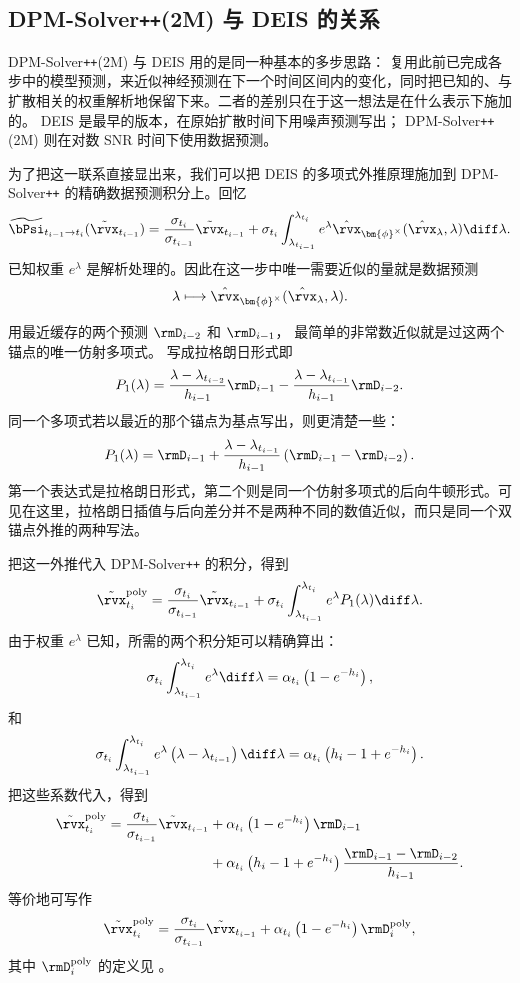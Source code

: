 \subsection{DPM-Solver\texttt{++}(2M) 与 DEIS 的关系}
\label{subsec:dpm-deis}

DPM-Solver\texttt{++}(2M) 与 DEIS 用的是同一种基本的多步思路：
复用此前已完成各步中的模型预测，来近似神经预测在下一个时间区间内的变化，同时把已知的、与扩散相关的权重解析地保留下来。二者的差别只在于这一想法是在什么表示下施加的。
DEIS 是最早的版本，在原始扩散时间下用噪声预测写出；
DPM-Solver\texttt{++}(2M) 则在对数 SNR 时间下使用数据预测。

为了把这一联系直接显出来，我们可以把 DEIS 的多项式外推原理施加到 DPM-Solver\texttt{++} 的精确数据预测积分上。回忆
\[
\widetilde\bPsi_{t_{i-1}\to t_i}
(\tilde\rvx_{t_{i-1}})
=
\frac{\sigma_{t_i}}{\sigma_{t_{i-1}}}
\tilde\rvx_{t_{i-1}}
+
\sigma_{t_i}
\int_{\lambda_{t_{i-1}}}^{\lambda_{t_i}}
e^\lambda
\hat{\rvx}_{\bm{\phi}^\times}
(\hat\rvx_\lambda,\lambda)
\diff\lambda.
\]
已知权重 $e^\lambda$ 是解析处理的。因此在这一步中唯一需要近似的量就是数据预测
\[
\lambda
\longmapsto
\hat{\rvx}_{\bm{\phi}^\times}
(\hat\rvx_\lambda,\lambda).
\]

用最近缓存的两个预测 $\rmD_{i-2}$ 和 $\rmD_{i-1}$，
最简单的非常数近似就是过这两个锚点的唯一仿射多项式。
写成拉格朗日形式即
\[
P_1(\lambda)
=
\frac{
\lambda-\lambda_{t_{i-2}}
}{
h_{i-1}
}
\rmD_{i-1}
-
\frac{
\lambda-\lambda_{t_{i-1}}
}{
h_{i-1}
}
\rmD_{i-2}.
\]
同一个多项式若以最近的那个锚点为基点写出，则更清楚一些：
\[
P_1(\lambda)
=
\rmD_{i-1}
+
\frac{
\lambda-\lambda_{t_{i-1}}
}{
h_{i-1}
}
\left(
\rmD_{i-1}-\rmD_{i-2}
\right).
\]
第一个表达式是拉格朗日形式，第二个则是同一个仿射多项式的后向牛顿形式。可见在这里，拉格朗日插值与后向差分并不是两种不同的数值近似，而只是同一个双锚点外推的两种写法。

把这一外推代入 DPM-Solver\texttt{++} 的积分，得到
\[
\tilde\rvx_{t_i}^{\mathrm{poly}}
=
\frac{\sigma_{t_i}}{\sigma_{t_{i-1}}}
\tilde\rvx_{t_{i-1}}
+
\sigma_{t_i}
\int_{\lambda_{t_{i-1}}}^{\lambda_{t_i}}
e^\lambda
P_1(\lambda)
\diff\lambda.
\]
由于权重 $e^\lambda$ 已知，所需的两个积分矩可以精确算出：
\[
\sigma_{t_i}
\int_{\lambda_{t_{i-1}}}^{\lambda_{t_i}}
e^\lambda\diff\lambda
=
\alpha_{t_i}
\left(
1-e^{-h_i}
\right),
\]
和
\[
\sigma_{t_i}
\int_{\lambda_{t_{i-1}}}^{\lambda_{t_i}}
e^\lambda
\left(
\lambda-\lambda_{t_{i-1}}
\right)
\diff\lambda
=
\alpha_{t_i}
\left(
h_i-1+e^{-h_i}
\right).
\]
把这些系数代入，得到
\begin{align*}
\tilde\rvx_{t_i}^{\mathrm{poly}}
=
\frac{\sigma_{t_i}}{\sigma_{t_{i-1}}}
\tilde\rvx_{t_{i-1}}
&+
\alpha_{t_i}
\left(
1-e^{-h_i}
\right)
\rmD_{i-1}
\\
&+
\alpha_{t_i}
\left(
h_i-1+e^{-h_i}
\right)
\frac{
\rmD_{i-1}-\rmD_{i-2}
}{
h_{i-1}
}.
\end{align*}
等价地可写作
\[
\tilde\rvx_{t_i}^{\mathrm{poly}}
=
\frac{\sigma_{t_i}}{\sigma_{t_{i-1}}}
\tilde\rvx_{t_{i-1}}
+
\alpha_{t_i}
\left(
1-e^{-h_i}
\right)
\rmD_i^{\mathrm{poly}},
\]
其中 $\rmD_i^{\mathrm{poly}}$ 的定义见
。

